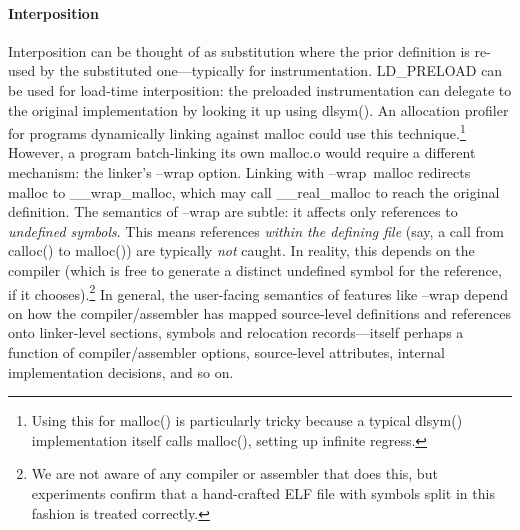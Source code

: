 \paragraph{Interposition}
Interposition can be thought of as substitution where the prior definition
is re-used by the substituted one---typically for instrumentation.
\textsf{LD\_PRELOAD} can be used for load-time interposition: the preloaded instrumentation can delegate to the original implementation by looking it up using \textsf{dlsym()}. 
An allocation profiler for programs dynamically linking against \textsf{malloc} could use this technique.\footnote{Using this for \textsf{malloc()} is particularly tricky because a typical \textsf{dlsym()} implementation itself calls \textsf{malloc()}, setting up infinite regress.}
However, a program batch-linking its own \textsf{malloc.o} would require a different mechanism: the linker's \textsf{--wrap} option. 
Linking with \textsf{--wrap~malloc} redirects \textsf{malloc} to \textsf{\_\_wrap\_malloc}, which may call \textsf{\_\_real\_malloc} to reach the original definition.
The semantics of \textsf{--wrap} are subtle: it affects only references to \emph{undefined symbols}.
This means references \emph{within the defining file} (say, a call from \textsf{calloc()} to \textsf{malloc()}) are typically \emph{not} caught. 
In reality, this depends on the compiler (which is free to generate a distinct undefined symbol for the reference, if it chooses).\footnote{We
are not aware of any compiler or assembler that does this, but experiments confirm that a hand-crafted ELF file with symbols split in this fashion is treated correctly.}
In general, the user-facing semantics of features like \textsf{--wrap} depend on how the compiler/assembler has mapped source-level definitions and references onto linker-level sections, symbols and relocation records---itself perhaps a function of compiler/assembler options, source-level attributes, internal implementation decisions, and so on.



